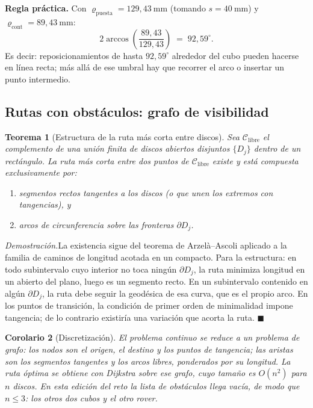 \documentclass[11pt,a4paper]{article}
\newtheorem{teorema}{Teorema}[section]
\newtheorem{corolario}[teorema]{Corolario}
\theoremstyle{definition}
\newenvironment{demo}{\par\noindent\textit{Demostración.}\;}{\hfill$\blacksquare$\par\medskip}
\newcommand{\grados}{^{\circ}}
\begin{document}
\begin{resultado}
\textbf{Regla práctica.} Con $\varrho_{\mathrm{puesta}} = 129{,}43\ \mathrm{mm}$
(tomando $s = 40\ \mathrm{mm}$) y $\varrho_{\mathrm{cont}} = 89{,}43\ \mathrm{mm}$:
\[
  2\arccos\!\left(\frac{89{,}43}{129{,}43}\right) \;=\; 92{,}59\grados .
\]
Es decir: reposicionamientos de hasta $92{,}59\grados$ alrededor del cubo pueden hacerse
en línea recta; más allá de ese umbral hay que recorrer el arco o insertar un punto
intermedio.
\end{resultado}

\subsection{Rutas con obstáculos: grafo de visibilidad}

\begin{teorema}[Estructura de la ruta más corta entre discos]
\label{teo:visibilidad}
Sea $\mathcal C_{\mathrm{libre}}$ el complemento de una unión finita de discos abiertos
disjuntos $\{D_j\}$ dentro de un rectángulo. La ruta más corta entre dos puntos de
$\mathcal C_{\mathrm{libre}}$ existe y está compuesta exclusivamente por:
\begin{enumerate}[label=(\alph*),leftmargin=2.2em]
\item segmentos rectos tangentes a los discos (o que unen los extremos con tangencias), y
\item arcos de circunferencia sobre las fronteras $\partial D_j$.
\end{enumerate}
\end{teorema}

\begin{demo}[Esbozo]
La existencia sigue del teorema de Arzelà--Ascoli aplicado a la familia de caminos de
longitud acotada en un compacto. Para la estructura: en todo subintervalo cuyo interior
no toca ningún $\partial D_j$, la ruta minimiza longitud en un abierto del plano, luego
es un segmento recto. En un subintervalo contenido en algún $\partial D_j$, la ruta debe
seguir la geodésica de esa curva, que es el propio arco. En los puntos de transición, la
condición de primer orden de minimalidad impone tangencia; de lo contrario existiría una
variación que acorta la ruta.
\end{demo}

\begin{corolario}[Discretización]
El problema continuo se reduce a un problema de grafo: los nodos son el origen, el
destino y los puntos de tangencia; las aristas son los segmentos tangentes y los arcos
libres, ponderados por su longitud. La ruta óptima se obtiene con Dijkstra sobre ese
grafo, cuyo tamaño es $O(n^2)$ para $n$ discos. En esta edición del reto la lista de
obstáculos llega vacía, de modo que $n \le 3$: los otros dos cubos y el otro rover.
\end{corolario}
\end{document}
